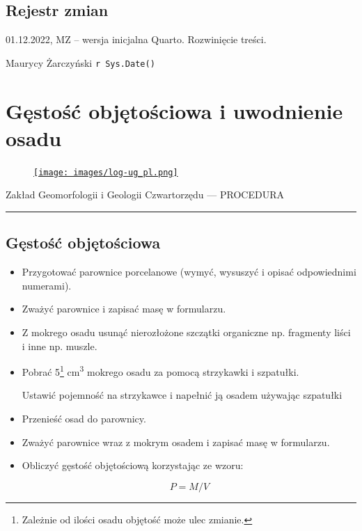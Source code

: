 \documentclass[
  letterpaper,
  DIV=11,
  numbers=noendperiod]{scrreprt}
\begin{document}
\hypertarget{pagebreak-rejestr-zmian-9}{%
\section{\texorpdfstring{\newpage{}Rejestr
zmian}{Rejestr zmian}}\label{pagebreak-rejestr-zmian-9}}

01.12.2022, MZ -- wersja inicjalna Quarto. Rozwinięcie treści.

Maurycy Żarczyński \texttt{r\ Sys.Date()}

\hypertarget{gux119stoux15bux107-objux119toux15bciowa-i-uwodnienie-osadu}{%
\chapter{Gęstość objętościowa i uwodnienie
osadu}\label{gux119stoux15bux107-objux119toux15bciowa-i-uwodnienie-osadu}}

\begin{figure}

\href{https://geomorfologia.ug.edu.pl}{\texttt{[image: images/log-ug\_pl.png]}}

\end{figure}

Zakład Geomorfologii i Geologii Czwartorzędu --- PROCEDURA

\begin{center}\rule{0.5\linewidth}{0.5pt}\end{center}

\hypertarget{gux119stoux15bux107-objux119toux15bciowa}{%
\section{Gęstość
objętościowa}\label{gux119stoux15bux107-objux119toux15bciowa}}

\begin{itemize}
\item
  Przygotować parownice porcelanowe (wymyć, wysuszyć i opisać
  odpowiednimi numerami).
\item
  Zważyć parownice i zapisać masę w formularzu.
\item
  Z mokrego osadu usunąć nierozłożone szczątki organiczne np. fragmenty
  liści i inne np. muszle.
\item
  Pobrać 5\footnote{Zależnie od ilości osadu objętość może ulec zmianie.}
  cm\textsuperscript{3} mokrego osadu za pomocą strzykawki i szpatułki.

  Ustawić pojemność na strzykawce i napełnić ją osadem używając
  szpatułki
\item
  Przenieść osad do parownicy.
\item
  Zważyć parownice wraz z mokrym osadem i zapisać masę w formularzu.
\item
  Obliczyć gęstość objętościową korzystając ze wzoru:

  \[
  P = M / V
  \]
\end{itemize}
\end{document}
